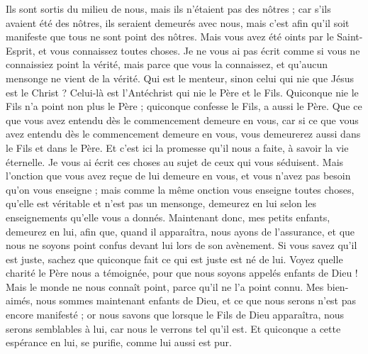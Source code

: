 \begin{multicols}{2}
Ils sont sortis du milieu de nous, mais ils n'étaient pas des nôtres ; car s'ils avaient été des nôtres, ils seraient demeurés avec nous, mais c'est afin qu'il soit manifeste que tous ne sont point des nôtres.
Mais vous avez été oints par le Saint-Esprit, et vous connaissez toutes choses.
Je ne vous ai pas écrit comme si vous ne connaissiez point la vérité, mais parce que vous la connaissez, et qu'aucun mensonge ne vient de la vérité.
Qui est le menteur, sinon celui qui nie que Jésus est le Christ ? Celui-là est l'Antéchrist qui nie le Père et le Fils.
Quiconque nie le Fils n'a point non plus le Père ; quiconque confesse le Fils, a aussi le Père.
Que ce que vous avez entendu dès le commencement demeure en vous, car si ce que vous avez entendu dès le commencement demeure en vous, vous demeurerez aussi dans le Fils et dans le Père.
Et c'est ici la promesse qu'il nous a faite, à savoir la vie éternelle.
Je vous ai écrit ces choses au sujet de ceux qui vous séduisent.
Mais l'onction que vous avez reçue de lui demeure en vous, et vous n'avez pas besoin qu'on vous enseigne ; mais comme la même onction vous enseigne toutes choses, qu'elle est véritable et n'est pas un mensonge, demeurez en lui selon les enseignements qu'elle vous a donnés.
Maintenant donc, mes petits enfants, demeurez en lui, afin que, quand il apparaîtra, nous ayons de l'assurance, et que nous ne soyons point confus devant lui lors de son avènement.
Si vous savez qu'il est juste, sachez que quiconque fait ce qui est juste est né de lui.
\VerseOne{}Voyez quelle charité le Père nous a témoignée, pour que nous soyons appelés enfants de Dieu ! Mais le monde ne nous connaît point, parce qu'il ne l'a point connu.
Mes bien-aimés, nous sommes maintenant enfants de Dieu, et ce que nous serons n'est pas encore manifesté ; or nous savons que lorsque le Fils de Dieu apparaîtra, nous serons semblables à lui, car nous le verrons tel qu'il est.
Et quiconque a cette espérance en lui, se purifie, comme lui aussi est pur.

\end{multicols}
